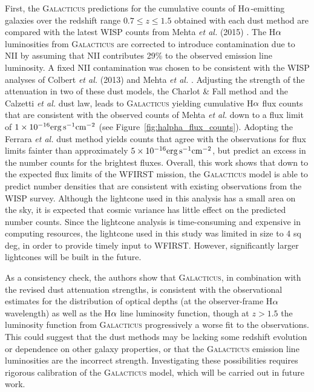 First, the \textsc{Galacticus} predictions for the cumulative counts
of H${\rm \alpha}$-emitting galaxies over the redshift range
$0.7\leqslant z\leqslant 1.5$ obtained with each dust method are
compared with the latest WISP counts from Mehta \textit{et al.} (2015)
\cite{Mehta2015}. The H${\rm \alpha}$ luminosities from
\textsc{Galacticus} are corrected to introduce contamination due to
NII by assuming that NII contributes 29\% to the observed emission
line luminosity. A fixed NII contamination was chosen to be consistent
with the WISP analyses of Colbert \textit{et al.} (2013)
\cite{Colbert13} and Mehta \textit{et al.} \cite{Mehta2015}. Adjusting
the strength of the attenuation in two of these dust models, the
Charlot \& Fall \cite{Charlot00} method and the Calzetti \textit{et
  al.}  \cite{Calzetti00} dust law, leads to \textsc{Galacticus}
yielding cumulative H${\rm \alpha}$ flux counts that are consistent
with the observed counts of Mehta \textit{et al.}  \cite{Mehta2015}
down to a flux limit of $1\times 10^{-16}{\rm erg}\,{\rm s}^{-1}{\rm
  cm}^{-2}$ (see Figure~\ref{fig:halpha_flux_counts}). Adopting the
Ferrara \textit{et al.} \cite{Ferrara99} dust method yields counts
that agree with the observations for flux limits fainter than
approximately $5\times 10^{-16}{\rm erg}\,{\rm s}^{-1}{\rm cm}^{-2}$,
but predict an excess in the number counts for the brightest
fluxes. Overall, this work shows that down to the expected flux limits
of the WFIRST mission, the \textsc{Galacticus} model is able to
predict number densities that are consistent with existing
observations from the WISP survey. Although the lightcone used in this
analysis has a small area on the sky, it is expected that cosmic
variance has little effect on the predicted number counts. Since the
lightcone analysis is time-consuming and expensive in computing
resources, the lightcone used in this study was limited in size to 4
sq deg, in order to provide timely input to WFIRST. However,
significantly larger lightcones will be built in the future.

As a consistency check, the authors show that \textsc{Galacticus}, in
combination with the revised dust attenuation strengths, is consistent
with the observational estimates for the distribution of optical
depths (at the observer-frame H${\rm \alpha}$ wavelength) as well as
the H${\rm \alpha}$ line luminosity function, though at $z> 1.5$ the
luminosity function from \textsc{Galacticus} progressively a worse fit
to the observations. This could suggest that the dust methods may be
lacking some redshift evolution or dependence on other galaxy
properties, or that the \textsc{Galacticus} emission line luminosities
are the incorrect strength. Investigating these possibilities requires
rigorous calibration of the \textsc{Galacticus} model, which will be
carried out in future work.


